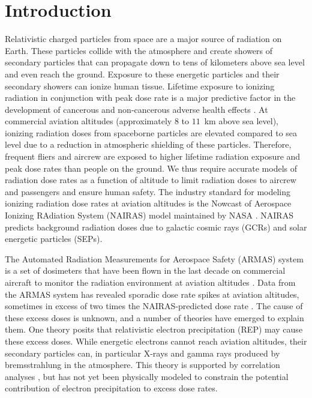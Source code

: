 \documentclass[draft]{agujournal2019}
\begin{document}
\section{Introduction}
Relativistic charged particles from space are a major source of radiation on Earth. These particles collide with the atmosphere and create showers of secondary particles that can propagate down to tens of kilometers above sea level and even reach the ground. Exposure to these energetic particles and their secondary showers can ionize human tissue. Lifetime exposure to ionizing radiation in conjunction with peak dose rate is a major predictive factor in the development of cancerous and non-cancerous adverse health effects \cite{lowe2022, shah2014}. At commercial aviation altitudes (approximately $8$ to $11$~km above sea level), ionizing radiation doses from spaceborne particles are elevated compared to sea level due to a reduction in atmospheric shielding of these particles. Therefore, frequent fliers and aircrew are exposed to higher lifetime radiation exposure and peak dose rates than people on the ground. We thus require accurate models of radiation dose rates as a function of altitude to limit radiation doses to aircrew and passengers and ensure human safety. The industry standard for modeling ionizing radiation dose rates at aviation altitudes is the Nowcast of Aerospace Ionizing RAdiation System (NAIRAS) model maintained by NASA \cite{mertens2013}. NAIRAS predicts background radiation doses due to galactic cosmic rays (GCRs) and solar energetic particles (SEPs).

The Automated Radiation Measurements for Aerospace Safety (ARMAS) system is a set of dosimeters that have been flown in the last decade on commercial aircraft to monitor the radiation environment at aviation altitudes \cite{tobiska2016}. Data from the ARMAS system has revealed sporadic dose rate spikes at aviation altitudes, sometimes in excess of two times the NAIRAS-predicted dose rate \cite{tobiska2016, tobiska2018}. The cause of these excess doses is unknown, and a number of theories have emerged to explain them. One theory posits that relativistic electron precipitation (REP) may cause these excess doses. While energetic electrons cannot reach aviation altitudes, their secondary particles can, in particular X-rays and gamma rays produced by bremsstrahlung in the atmosphere. This theory is supported by correlation analyses \cite{aryan2023, aryan2025a, aryan2025b}, but has not yet been physically modeled to constrain the potential contribution of electron precipitation to excess dose rates.
\end{document}
